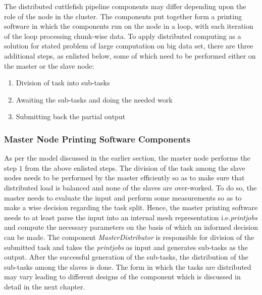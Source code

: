 The distributed cuttlefish pipeline components may differ depending upon the role of the node in the cluster. The components put together form a printing software in which the components run on the node in a loop, with each iteration of the loop processing chunk-wise data. To apply distributed computing as a solution for stated problem of large computation on big data set, there are three additional steps, as enlisted below, some of which need to be performed either on the master or the slave node:  
\begin{enumerate}
\item Division of task into sub-tasks 
\item Awaiting the sub-tasks and doing the needed work
\item Submitting back the partial output
\end{enumerate}

\subsubsection{Master Node Printing Software Components}
As per the model discussed in the earlier section, the master node performs the step $1$ from the above enlisted steps. The division of the task among the slave nodes needs to be performed by the master efficiently so as to make sure that distributed load is balanced and none of the slaves are over-worked. To do so, the master needs to evaluate the input and perform some measurements so as to make a wise decision regarding the task split. Hence, the master printing software needs to at least parse the input into an internal mesh representation i.e.\textit{printjobs} and compute the necessary parameters on the basis of which an informed decision can be made. The component \textit{MasterDistributor} is responsible for division of the submitted task and takes the \textit{printjobs} as input and generates sub-tasks as the output. After the successful generation of the sub-tasks, the distribution of the sub-tasks among the slaves is done. The form in which the tasks are distributed may vary leading to different designs of the component which is discussed in detail in the next chapter. 

